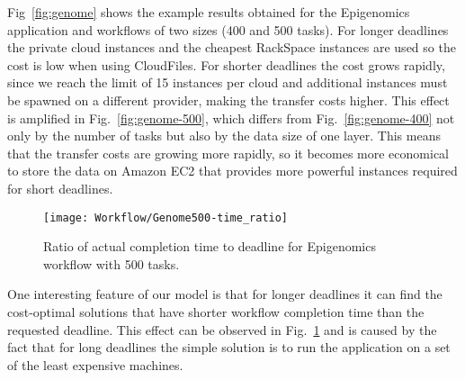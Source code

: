 {    Fig~\ref{fig:genome} shows the example results obtained for the Epigenomics
    application and workflows of two sizes (400 and 500 tasks).
    For longer deadlines the private cloud instances and the cheapest RackSpace
    instances are used so the cost is low when using CloudFiles. For shorter
    deadlines the cost grows rapidly, since we reach the limit of 15 instances
    per cloud and additional instances must be spawned on a different provider,
    making the transfer costs higher. This effect is amplified in
    Fig.~\ref{fig:genome-500}, which differs from Fig.~\ref{fig:genome-400} not
    only by the number of tasks but also by the data size of one layer.
    This means that the transfer costs are growing more rapidly, so it becomes
    more economical to store the data on Amazon EC2 that provides more powerful
    instances required for short deadlines.
    
    \begin{figure}[tb]
       \centering \texttt{[image: Workflow/Genome500-time\_ratio]}
       \caption{Ratio of actual completion time to deadline for Epigenomics workflow with 500 tasks.
       \label{fig:genome-500-ratio}}
    \end{figure}
    
    One interesting feature of our model is that for longer deadlines it can
    find the cost-optimal solutions that have shorter workflow completion time
    than the requested deadline. This effect can be observed in
    Fig.~\ref{fig:genome-500-ratio} and is caused by the fact that for long
    deadlines the simple solution is to run the application on a set of the least expensive machines. 
    
}
